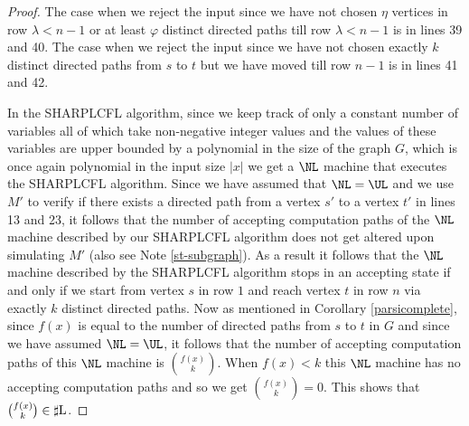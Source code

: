\documentclass{amsbook}
\theoremstyle{definition}
\theoremstyle{remark}
\numberwithin{section}{chapter}
\numberwithin{equation}{chapter}
\newcommand{\sharpL}{\mbox{$\sharp$\rm L}}
\begin{document}
\begin{proof}
The case when we reject the input since we have not chosen $\eta$ vertices in row $\lambda <n-1$ or at least $\varphi$ distinct directed paths till row $\lambda <n-1$ is in lines 39 and 40. The case when we reject the input since we have not chosen exactly $k$ distinct directed paths from $s$ to $t$ but we have moved till row $n-1$ is in lines 41 and 42.

In the SHARPLCFL algorithm, since we keep track of only a constant number of variables all of which take non-negative integer values and the values of these variables are upper bounded by a polynomial in the size of the graph $G$, which is once again polynomial in the input size $|x|$ we get a $\NL$ machine that executes the SHARPLCFL algorithm. Since we have assumed that $\NL =\UL$ and we use $M'$ to verify if there exists a directed path from a vertex $s'$ to a vertex $t'$ in lines 13 and 23, it follows that the number of accepting computation paths of the $\NL$ machine described by our SHARPLCFL algorithm does not get altered upon simulating $M'$ (also see Note \ref{st-subgraph}). As a result it follows that the $\NL$ machine described by the SHARPLCFL algorithm stops in an accepting state if and only if we start from vertex $s$ in row $1$ and reach vertex $t$ in row $n$ via exactly $k$ distinct directed paths. Now as mentioned in Corollary \ref{parsicomplete}, since $f(x)$ is
  equal to the number of directed paths from $s$ to $t$ in $G$ and since we have assumed $\NL =\UL$, it
  follows that the number of accepting computation paths of this $\NL$ machine is ${{f(x)}\choose{k}}$. When $f(x)<k$ this $\NL$ machine has no
  accepting computation paths and so we get ${{f(x)}\choose {k}}=0$.
 This shows that ${{f(x)}\choose{k}}\in \sharpL$.
\end{proof}
\end{document}
